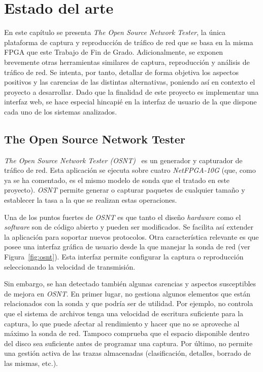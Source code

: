 \chapter{Estado del arte\label{cap:estadoDelArte}}

En este capítulo se presenta \textit{The Open Source Network Tester}, la única plataforma de captura y reproducción de tráfico de red que se basa en la misma \gls{FPGA} que este Trabajo de Fin de Grado.
Adicionalmente, se exponen brevemente otras herramientas similares de captura, reproducción y análisis de tráfico de red.
Se intenta, por tanto, detallar de forma objetiva los aspectos positivos y las carencias de las distintas alternativas, poniendo así en contexto el proyecto a desarrollar.
Dado que la finalidad de este proyecto es implementar una interfaz web, se hace especial hincapié en la interfaz de usuario de la que dispone cada uno de los sistemas analizados.

\section{The Open Source Network Tester\label{sec:eda:osnt}}

\textit{The Open Source Network Tester (OSNT)}~\cite{osnt} es un generador y capturador de tráfico de red.
Esta aplicación se ejecuta sobre cuatro \textit{NetFPGA-10G} (que, como ya se ha comentado, es el mismo modelo de sonda que el tratado en este proyecto).
\textit{OSNT} permite generar o capturar paquetes de cualquier tamaño y establecer la tasa a la que se realizan estas operaciones.

Una de los puntos fuertes de \textit{OSNT} es que tanto el diseño \textit{hardware} como el \textit{software} son de código abierto y pueden ser modificados.
Se facilita así extender la aplicación para soportar nuevos protocolos.
Otra característica relevante es que posee una interfaz gráfica de usuario desde la que manejar la sonda de red (ver Figura~\ref{fig:osnt}).
Esta interfaz permite configurar la captura o reproducción seleccionando la velocidad de transmisión.

Sin embargo, se han detectado también algunas carencias y aspectos susceptibles de mejora en \textit{OSNT}.
En primer lugar, no gestiona algunos elementos que están relacionados con la sonda y que podría ser de utilidad.
Por ejemplo, no controla que el sistema de archivos tenga una velocidad de escritura suficiente para la captura, lo que puede afectar al rendimiento y hacer que no se aproveche al máximo la sonda de red.
Tampoco comprueba que el espacio disponible dentro del disco sea suficiente antes de programar una captura.
Por último, no permite una gestión activa de las \glspl{traza} almacenadas (clasificación, detalles, borrado de las mismas, etc.).

